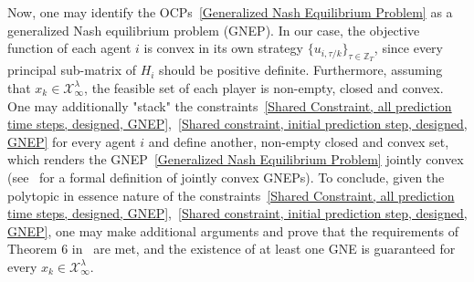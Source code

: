 \documentclass[letterpaper, 10 pt, conference]{ieeeconf}  %
\begin{document}
Now, one may identify the OCPs~\eqref{Generalized Nash Equilibrium Problem} as a generalized Nash equilibrium problem (GNEP). In our case, the objective function of each agent $i$ is convex in its own strategy $\{u_{i,\tau/k}\}_{\tau \in \mathbb{Z}_{T}}$, since every principal sub-matrix of $H_{i}$ should be positive definite. Furthermore, assuming that $x_{k} \in \mathcal{X}^{\lambda}_{\infty}$, the feasible set of each player is non-empty, closed and convex. One may additionally "stack" the constraints~\eqref{Shared Constraint, all prediction time steps, designed, GNEP},~\eqref{Shared constraint, initial prediction step, designed, GNEP} for every agent $i$ and define another, non-empty closed and convex set, which renders the GNEP~\eqref{Generalized Nash Equilibrium Problem} jointly convex (see~\cite{Facchinei2010gnep} for a formal definition of jointly convex GNEPs).
To conclude, given the polytopic in essence nature of the constraints~\eqref{Shared Constraint, all prediction time steps, designed, GNEP},~\eqref{Shared constraint, initial prediction step, designed, GNEP}, one may make additional arguments and prove that the requirements of Theorem 6 in~\cite{Facchinei2010gnep} are met, and the existence of at least one GNE is guaranteed for every $x_{k} \in \mathcal{X}^{\lambda}_{\infty}$.
\end{document}
